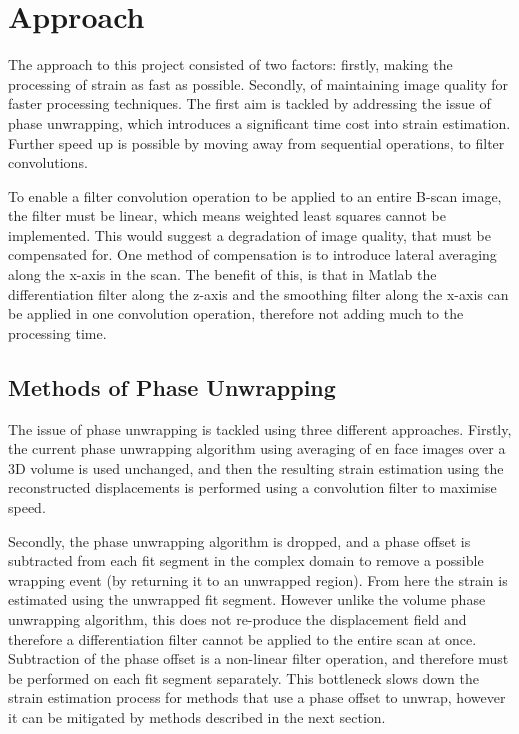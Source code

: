 \chapter{Approach}
The approach to this project consisted of two factors: firstly, making the processing of strain as fast as possible. Secondly, of maintaining image quality for faster processing techniques. The first aim is tackled by addressing the issue of phase unwrapping, which introduces a significant time cost into strain estimation. Further speed up is possible by moving away from sequential operations, to filter convolutions. 

To enable a filter convolution operation to be applied to an entire B-scan image, the filter must be linear, which means weighted least squares cannot be implemented. This would suggest a degradation of image quality, that must be compensated for. One method of compensation is to introduce lateral averaging along the x-axis in the scan. The benefit of this, is that in Matlab the differentiation filter along the z-axis and the smoothing filter along the x-axis can be applied in one convolution operation, therefore not adding much to the processing time.

\section{Methods of Phase Unwrapping}
The issue of phase unwrapping is tackled using three different approaches. Firstly, the current phase unwrapping algorithm using averaging of en face images over a 3D volume is used unchanged, and then the resulting strain estimation using the reconstructed displacements is performed using a convolution filter to maximise speed. 

Secondly, the phase unwrapping algorithm is dropped, and a phase offset is subtracted from each fit segment in the complex domain to remove a possible wrapping event (by returning it to an unwrapped region). From here the strain is estimated using the unwrapped fit segment. However unlike the volume phase unwrapping algorithm, this does not re-produce the displacement field and therefore a differentiation filter cannot be applied to the entire scan at once. Subtraction of the phase offset is a non-linear filter operation, and therefore must be performed on each fit segment separately. This bottleneck slows down the strain estimation process for methods that use a phase offset to unwrap, however it can be mitigated by methods described in the next section.

